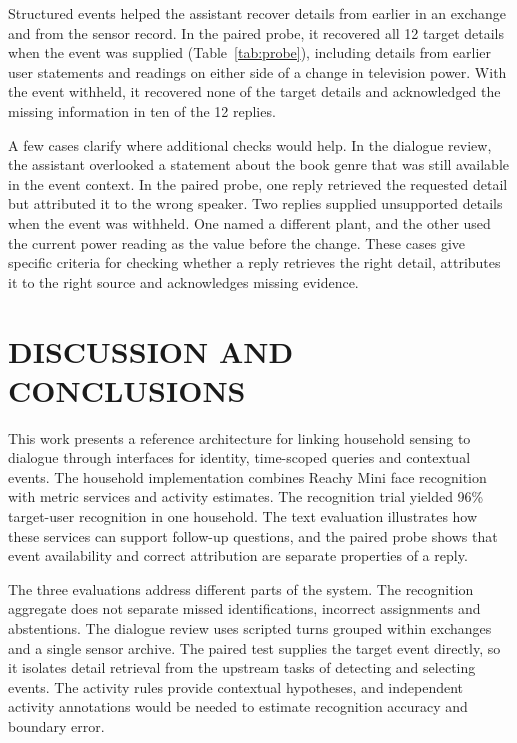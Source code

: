 \documentclass[a4paper,twoside]{article}
\begin{document}
Structured events helped the assistant recover details from earlier in an exchange and from the sensor record. In the paired probe, it recovered all 12 target details when the event was supplied (Table~\ref{tab:probe}), including details from earlier user statements and readings on either side of a change in television power. With the event withheld, it recovered none of the target details and acknowledged the missing information in ten of the 12 replies.

A few cases clarify where additional checks would help. In the dialogue review, the assistant overlooked a statement about the book genre that was still available in the event context. In the paired probe, one reply retrieved the requested detail but attributed it to the wrong speaker. Two replies supplied unsupported details when the event was withheld. One named a different plant, and the other used the current power reading as the value before the change. These cases give specific criteria for checking whether a reply retrieves the right detail, attributes it to the right source and acknowledges missing evidence.

\FloatBarrier
\section{\uppercase{Discussion and Conclusions}}
\label{sec:discussion}

This work presents a reference architecture for linking household sensing to dialogue through interfaces for identity, time-scoped queries and contextual events. The household implementation combines Reachy Mini face recognition with metric services and activity estimates. The recognition trial yielded 96\% target-user recognition in one household. The text evaluation illustrates how these services can support follow-up questions, and the paired probe shows that event availability and correct attribution are separate properties of a reply.

The three evaluations address different parts of the system. The recognition aggregate does not separate missed identifications, incorrect assignments and abstentions. The dialogue review uses scripted turns grouped within exchanges and a single sensor archive. The paired test supplies the target event directly, so it isolates detail retrieval from the upstream tasks of detecting and selecting events. The activity rules provide contextual hypotheses, and independent activity annotations would be needed to estimate recognition accuracy and boundary error.
\end{document}
